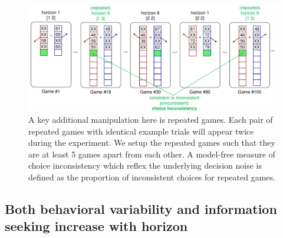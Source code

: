 \documentclass[12pt]{article}
\begin{document}
	\begin{figure}[h]
		\begin{center}
			\includegraphics[width=\textwidth]{figures/taskfiga.pdf}
			\caption{A key additional manipulation here is repeated games. Each pair of repeated games with identical example trials will appear twice during the experiment. We setup the repeated games such that they are at least 5 games apart from each other. A model-free measure of choice inconsistency which reflex the underlying decision noise is defined as the proportion of inconsistent choices for repeated games.}
			\label{fig:taskfig}
		\end{center}
	\end{figure}
	
	\subsection*{Both behavioral variability and information seeking increase with horizon}
	
	
	
	
\end{document}
